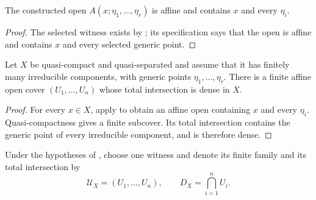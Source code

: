 \begin{lemma}
  \label{lemma:nagata-affine-neighbourhood-generic-points}

  The constructed open $A(x;\eta_1,\ldots,\eta_r)$ is affine and contains
  $x$ and every $\eta_i$.
\end{lemma}

\begin{proof}
  The selected witness exists by
  ; its
  specification says that the open is affine and contains $x$ and every
  selected generic point.
\end{proof}

\begin{lemma}
  \label{lemma:nagata-dense-affine-cover-exists}
  \leanok

  Let $X$ be quasi-compact and quasi-separated and assume that it has finitely
  many irreducible components, with generic points
  $\eta_1,\ldots,\eta_r$.  There is a finite affine open cover
  $(U_1,\ldots,U_n)$ whose total intersection is dense in $X$.
\end{lemma}

\begin{proof}
  \leanok
  For every $x\in X$, apply
   to obtain an affine
  open containing $x$ and every $\eta_i$.  Quasi-compactness gives a finite
  subcover.  Its total intersection contains the generic point of every
  irreducible component, and is therefore dense.
\end{proof}

\begin{definition}
  \label{def:nagata-dense-affine-cover}
  \leanok

  Under the hypotheses of
  , choose one witness and denote
  its finite family and its total intersection by
  \[
    \mathcal U_X=(U_1,\ldots,U_n),
    \qquad D_X=\bigcap_{i=1}^nU_i.
  \]
\end{definition}

